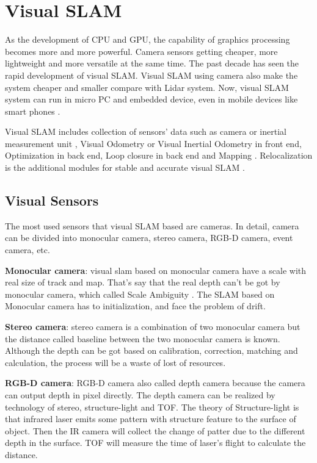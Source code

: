 \documentclass[journal,transmag]{IEEEtran}
\begin{document}
\section{Visual SLAM}
As the development of CPU and GPU, the capability of graphics processing  becomes more and more powerful. Camera sensors getting cheaper, more lightweight and more versatile at the same time. The past decade has seen the rapid development of visual SLAM. Visual SLAM using camera also make the system cheaper and smaller compare with Lidar system. Now, visual SLAM system can run in micro PC and embedded device, even in mobile devices like smart phones \cite{mur2015orb}\cite{qin2018vins}\cite{klein2009parallel}\cite{InfiniTAM_ISMAR_2015}\cite{lynen2015get}. 

Visual SLAM includes collection of sensors' data such as camera or inertial measurement unit , Visual Odometry or Visual Inertial Odometry in front end, Optimization in back end, Loop closure in back end and Mapping \cite{Gao2017SLAM}.  Relocalization is the additional modules for stable and accurate visual SLAM \cite{taketomi2017visual}.
\subsection{Visual Sensors}
The most used sensors that visual SLAM based are cameras. In detail, camera can be divided into monocular camera, stereo camera, RGB-D camera, event camera, etc.

\textbf{Monocular camera}: visual slam based on monocular camera have a scale with real size of track and map. That's say that the real depth can't be got by monocular camera, which called Scale Ambiguity \cite{Zhangguofeng2016}. The SLAM based on Monocular camera has to initialization, and face the problem of drift.

\textbf{Stereo camera}: stereo camera is a combination of two monocular camera but the distance called baseline between the two monocular camera is known. Although the depth can be got based on calibration, correction, matching and calculation, the process will be a waste of lost of resources. 

\textbf{RGB-D camera}: RGB-D camera also called depth camera because the camera can output depth in pixel directly. The depth camera can be realized by technology of stereo, structure-light and TOF. The theory of Structure-light is that infrared laser emits some pattern with structure feature to the surface of object. Then the IR camera will collect the change of patter due to the different depth in the surface. TOF will measure the time of laser's flight to calculate the distance.
\end{document}
